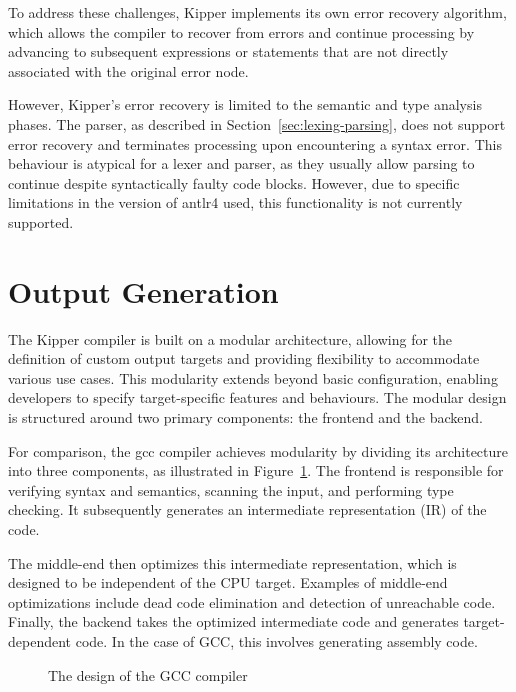 To address these challenges, Kipper implements its own error recovery algorithm, which allows the compiler to recover from errors and continue processing by advancing to subsequent expressions or statements that are not directly associated with the original error node.

However, Kipper's error recovery is limited to the semantic and type analysis phases. The parser, as described in Section~\ref{sec:lexing-parsing}, does not support error recovery and terminates processing upon encountering a syntax error. This behaviour is atypical for a lexer and parser, as they usually allow parsing to continue despite syntactically faulty code blocks. However, due to specific limitations in the version of \Gls{antlr4} used, this functionality is not currently supported.

\section{Output Generation}
\label{sec:output-generation}

The Kipper compiler is built on a modular architecture, allowing for the definition of custom output targets and providing flexibility to accommodate various use cases. This modularity extends beyond basic configuration, enabling developers to specify target-specific features and behaviours. The modular design is structured around two primary components: the frontend and the backend.

For comparison, the \acrshort{gcc} compiler achieves modularity by dividing its architecture into three components, as illustrated in Figure~\ref{fig:implementation:gcccompiler}. The frontend is responsible for verifying syntax and semantics, scanning the input, and performing type checking. It subsequently generates an intermediate representation (IR) of the code.

The middle-end then optimizes this intermediate representation, which is designed to be independent of the CPU target. Examples of middle-end optimizations include dead code elimination and detection of unreachable code. Finally, the backend takes the optimized intermediate code and generates target-dependent code. In the case of GCC, this involves generating assembly code.

\begin{figure}[h!]
	\centering
	\def\stackalignment{r}
	\caption{The design of the GCC compiler}
	\label{fig:implementation:gcccompiler}
\end{figure}

